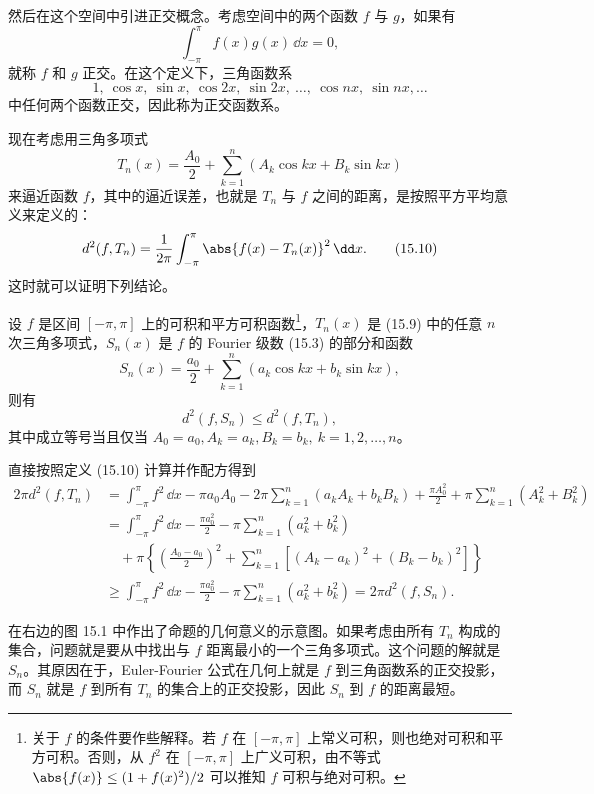 然后在这个空间中引进正交概念。考虑空间中的两个函数 $f$ 与 $g$，如果有
\[
  \int_{-\pi}^{\pi}f(x)g(x)\,\dd x=0,
\]
就称 $f$ 和 $g$ 正交。在这个定义下，三角函数系
\[
  1,\ \cos x,\ \sin x,\ \cos2x,\ \sin2x,\ \ldots,\ \cos nx,\ \sin nx,\ldots
\]
中任何两个函数正交，因此称为正交函数系。

现在考虑用三角多项式
\begin{equation}
  T_n(x)=\frac{A_0}{2}+\sum_{k=1}^{n}(A_k\cos kx+B_k\sin kx)
  \tag{15.9}
  \label{eq:15.9}
\end{equation}
来逼近函数 $f$，其中的逼近误差，也就是 $T_n$ 与 $f$ 之间的距离，是按照平方平均意义来定义的：
\begin{equation}
  d^2(f,T_n)=\frac1{2\pi}\int_{-\pi}^{\pi}\abs{f(x)-T_n(x)}^2\,\dd x.
  \tag{15.10}
  \label{eq:15.10}
\end{equation}
这时就可以证明下列结论。

\begin{xproposition}
设 $f$ 是区间 $[-\pi,\pi]$ 上的可积和平方可积函数\footnote{关于 $f$ 的条件要作些解释。若 $f$ 在 $[-\pi,\pi]$ 上常义可积，则也绝对可积和平方可积。否则，从 $f^2$ 在 $[-\pi,\pi]$ 上广义可积，由不等式 $\abs{f(x)}\le(1+f(x)^2)/2$ 可以推知 $f$ 可积与绝对可积。}，$T_n(x)$ 是 (15.9) 中的任意 $n$ 次三角多项式，$S_n(x)$ 是 $f$ 的 Fourier 级数 (15.3) 的部分和函数
\[
  S_n(x)=\frac{a_0}{2}+\sum_{k=1}^{n}(a_k\cos kx+b_k\sin kx),
\]
则有
\[
  d^2(f,S_n)\le d^2(f,T_n),
\]
其中成立等号当且仅当 $A_0=a_0,A_k=a_k,B_k=b_k,\ k=1,2,\ldots,n$。
\end{xproposition}

\begin{xproof}
直接按照定义 (15.10) 计算并作配方得到
\begin{align*}
  2\pi d^2(f,T_n)
  &=\int_{-\pi}^{\pi}f^2\,\dd x-\pi a_0A_0-2\pi\sum_{k=1}^{n}(a_kA_k+b_kB_k)
    +\frac{\pi A_0^2}{2}+\pi\sum_{k=1}^{n}(A_k^2+B_k^2)\\
  &=\int_{-\pi}^{\pi}f^2\,\dd x-\frac{\pi a_0^2}{2}-\pi\sum_{k=1}^{n}(a_k^2+b_k^2)\\
  &\quad+\pi\left\{\left(\frac{A_0-a_0}{2}\right)^2
      +\sum_{k=1}^{n}\left[(A_k-a_k)^2+(B_k-b_k)^2\right]\right\}\\
  &\ge \int_{-\pi}^{\pi}f^2\,\dd x-\frac{\pi a_0^2}{2}-\pi\sum_{k=1}^{n}(a_k^2+b_k^2)
  =2\pi d^2(f,S_n).
\end{align*}
\end{xproof}

\begin{xremark}
在右边的图 15.1 中作出了命题的几何意义的示意图。如果考虑由所有 $T_n$ 构成的集合，问题就是要从中找出与 $f$ 距离最小的一个三角多项式。这个问题的解就是 $S_n$。其原因在于，Euler-Fourier 公式在几何上就是 $f$ 到三角函数系的正交投影，而 $S_n$ 就是 $f$ 到所有 $T_n$ 的集合上的正交投影，因此 $S_n$ 到 $f$ 的距离最短。
\end{xremark}

